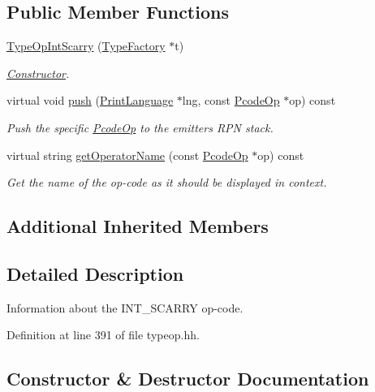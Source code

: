\subsection*{Public Member Functions}
\begin{DoxyCompactItemize}
\item 
\mbox{\hyperlink{class_type_op_int_scarry_a1dfdc4943d6250ecb5cb4caa201a5488}{Type\+Op\+Int\+Scarry}} (\mbox{\hyperlink{class_type_factory}{Type\+Factory}} $\ast$t)
\begin{DoxyCompactList}\small\item\em \mbox{\hyperlink{class_constructor}{Constructor}}. \end{DoxyCompactList}\item 
virtual void \mbox{\hyperlink{class_type_op_int_scarry_a371c4edf70f55a60974caf98b6c7638f}{push}} (\mbox{\hyperlink{class_print_language}{Print\+Language}} $\ast$lng, const \mbox{\hyperlink{class_pcode_op}{Pcode\+Op}} $\ast$op) const
\begin{DoxyCompactList}\small\item\em Push the specific \mbox{\hyperlink{class_pcode_op}{Pcode\+Op}} to the emitter\textquotesingle{}s R\+PN stack. \end{DoxyCompactList}\item 
virtual string \mbox{\hyperlink{class_type_op_int_scarry_a7808f16bddeba6d5b61bd2b24fe96143}{get\+Operator\+Name}} (const \mbox{\hyperlink{class_pcode_op}{Pcode\+Op}} $\ast$op) const
\begin{DoxyCompactList}\small\item\em Get the name of the op-\/code as it should be displayed in context. \end{DoxyCompactList}\end{DoxyCompactItemize}
\subsection*{Additional Inherited Members}


\subsection{Detailed Description}
Information about the I\+N\+T\+\_\+\+S\+C\+A\+R\+RY op-\/code. 

Definition at line 391 of file typeop.\+hh.



\subsection{Constructor \& Destructor Documentation}
\mbox{\label{class_type_op_int_scarry_a1dfdc4943d6250ecb5cb4caa201a5488}} 

